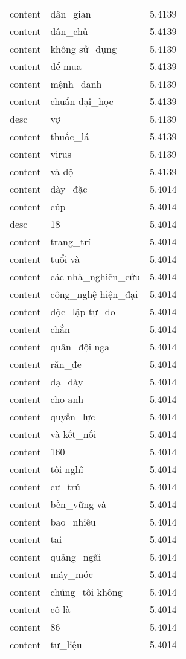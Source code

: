 \documentclass{article}
\begin{document}
\begin{tabular}{lll}
content & dân\_gian & 5.4139\\
content & dân\_chủ & 5.4139\\
content & không sử\_dụng & 5.4139\\
content & để mua & 5.4139\\
content & mệnh\_danh & 5.4139\\
content & chuẩn đại\_học & 5.4139\\
desc & vợ & 5.4139\\
content & thuốc\_lá & 5.4139\\
content & virus & 5.4139\\
content & và độ & 5.4139\\
content & dày\_đặc & 5.4014\\
content & cúp & 5.4014\\
desc & 18 & 5.4014\\
content & trang\_trí & 5.4014\\
content & tuổi và & 5.4014\\
content & các nhà\_nghiên\_cứu & 5.4014\\
content & công\_nghệ hiện\_đại & 5.4014\\
content & độc\_lập tự\_do & 5.4014\\
content & chắn & 5.4014\\
content & quân\_đội nga & 5.4014\\
content & răn\_đe & 5.4014\\
content & dạ\_dày & 5.4014\\
content & cho anh & 5.4014\\
content & quyền\_lực & 5.4014\\
content & và kết\_nối & 5.4014\\
content & 160 & 5.4014\\
content & tôi nghĩ & 5.4014\\
content & cư\_trú & 5.4014\\
content & bền\_vững và & 5.4014\\
content & bao\_nhiêu & 5.4014\\
content & tai & 5.4014\\
content & quảng\_ngãi & 5.4014\\
content & máy\_móc & 5.4014\\
content & chúng\_tôi không & 5.4014\\
content & cô là & 5.4014\\
content & 86 & 5.4014\\
content & tư\_liệu & 5.4014\\

\end{tabular}
\end{document}
